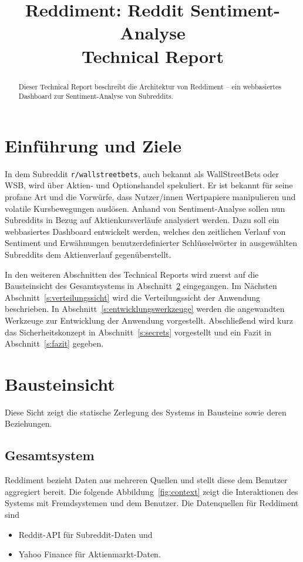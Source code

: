 \documentclass[a4paper, 10pt, conference]{IEEEtran}
\title{\LARGE
\textbf{Reddiment: Reddit Sentiment-Analyse} \\ Technical Report
}
\author{
\IEEEauthorblockN{Tobias Bauer} \IEEEauthorblockA{\textit{t.bauer@oth-aw.de}}\and
\IEEEauthorblockN{Fabian Beer} \IEEEauthorblockA{\textit{f.beer1@oth-aw.de}}\and
\IEEEauthorblockN{Daniel Holl} \IEEEauthorblockA{\textit{d.holl1@oth-aw.de}}\and\and[\\]\and
\IEEEauthorblockN{Ardian Imeraj} \IEEEauthorblockA{\textit{a.imeraj@oth-aw.de}}\and
\IEEEauthorblockN{Konrad Schweiger} \IEEEauthorblockA{\textit{k.schweiger@oth-aw.de}}\and
\IEEEauthorblockN{Philipp Stangl} \IEEEauthorblockA{\textit{p.stangl1@oth-aw.de}}\and
\IEEEauthorblockN{Wolfgang Weigl} \IEEEauthorblockA{\textit{w.weigl@oth-aw.de}}\and
}
\begin{document}
\maketitle
\thispagestyle{empty}
\pagestyle{empty}

\begin{abstract}
Dieser Technical Report beschreibt die Architektur von Reddiment -- ein webbasiertes Dashboard zur Sentiment-Analyse von Subreddits.
\end{abstract}

\section{Einführung und Ziele}

In dem Subreddit \texttt{r/wallstreetbets}, auch bekannt als WallStreetBets oder WSB, wird über Aktien- und Optionshandel spekuliert. Er ist bekannt für seine profane Art und die Vorwürfe, dass Nutzer/innen Wertpapiere manipulieren und volatile Kursbewegungen auslösen. Anhand von Sentiment-Analyse sollen nun Subreddits in Bezug auf Aktienkursverläufe analysiert werden. Dazu soll ein webbasiertes Dashboard entwickelt werden, welches den zeitlichen Verlauf von Sentiment und Erwähnungen benutzerdefinierter Schlüsselwörter in ausgewählten Subreddits dem Aktienverlauf gegenüberstellt.

In den weiteren Abschnitten des Technical Reports wird zuerst auf die Bausteinsicht des Gesamtsystems in Abschnitt~\ref{s:bausteinsicht} eingegangen. Im Nächsten Abschnitt~\ref{s:verteilungssicht} wird die Verteilungssicht der Anwendung beschrieben. In Abschnitt~\ref{s:entwicklungswerkzeuge} werden die angewandten Werkzeuge zur Entwicklung der Anwendung vorgestellt. Abschließend wird kurz das Sicherheitskonzept in Abschnitt~\ref{s:secrets} vorgestellt und ein Fazit in Abschnitt~\ref{s:fazit} gegeben.

\section{Bausteinsicht} \label{s:bausteinsicht}
Diese Sicht zeigt die statische Zerlegung des Systems in Bausteine sowie deren Beziehungen.

\subsection{Gesamtsystem}
Reddiment bezieht Daten aus mehreren Quellen und stellt diese dem Benutzer aggregiert bereit. Die folgende Abbildung~\ref{fig:context} zeigt die Interaktionen des Systems mit Fremdsystemen und dem Benutzer. Die Datenquellen für Reddiment sind
\begin{itemize}
  \item Reddit-API für Subreddit-Daten und
  \item Yahoo Finance für Aktienmarkt-Daten.
\end{itemize}
\end{document}

